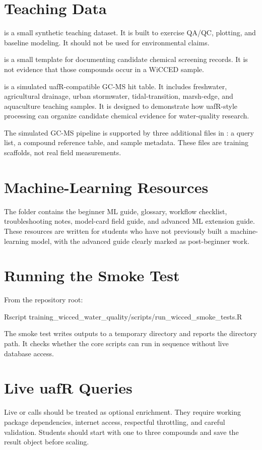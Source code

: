 \section{Teaching Data}

 is a small synthetic teaching dataset. It is built to exercise QA/QC, plotting, and baseline modeling. It should not be used for environmental claims.

 is a small template for documenting candidate chemical screening records. It is not evidence that those compounds occur in a WiCCED sample.

 is a simulated uafR-compatible GC-MS hit table. It includes freshwater, agricultural drainage, urban stormwater, tidal-transition, marsh-edge, and aquaculture teaching samples. It is designed to demonstrate how uafR-style processing can organize candidate chemical evidence for water-quality research.

The simulated GC-MS pipeline is supported by three additional files in : a query list, a compound reference table, and sample metadata. These files are training scaffolds, not real field measurements.

\section{Machine-Learning Resources}

The  folder contains the beginner ML guide, glossary, workflow checklist, troubleshooting notes, model-card field guide, and advanced ML extension guide. These resources are written for students who have not previously built a machine-learning model, with the advanced guide clearly marked as post-beginner work.

\section{Running the Smoke Test}

From the repository root:

\begin{rcode}
Rscript training_wicced_water_quality/scripts/run_wicced_smoke_tests.R
\end{rcode}

The smoke test writes outputs to a temporary directory and reports the directory path. It checks whether the core scripts can run in sequence without live database access.

\section{Live uafR Queries}

Live  or  calls should be treated as optional enrichment. They require working package dependencies, internet access, respectful throttling, and careful validation. Students should start with one to three compounds and save the result object before scaling.
